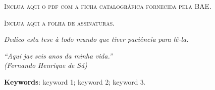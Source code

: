 \imprimircapa


\setcounter{page}{3}
\imprimirfolhaderosto*


\begin{fichacatalografica}
    \vspace*{\fill}
    \begin{center}
        \textsc{Inclua aqui o pdf com a ficha catalográfica fornecida pela BAE.}
    \end{center}
    \vspace*{\fill}
\end{fichacatalografica}


\newpage
\vspace*{\fill}
\begin{center}
    \textsc{Inclua aqui a folha de assinaturas.}
\end{center}
\vspace*{\fill}
\newpage
%
\cleardoublepage


\begin{dedicatoria}
    \vspace*{\fill}
    \centering
    \noindent
    \textit{Dedico esta tese à todo mundo que tiver paciência para lê-la.}
    \vspace*{\fill}
\end{dedicatoria}

\begin{agradecimentos}
    
\end{agradecimentos}

\begin{epigrafe}
    \vspace*{\fill}
    \begin{flushright}
        \textit{``Aqui jaz seis anos da minha vida.''\\
        (Fernando Henrique de Sá)}
    \end{flushright}
\end{epigrafe}

\begin{resumo}
    

    \noindent\textbf{Keywords}: keyword 1; keyword 2; keyword 3.
    \vspace{\fill}
\end{resumo}


